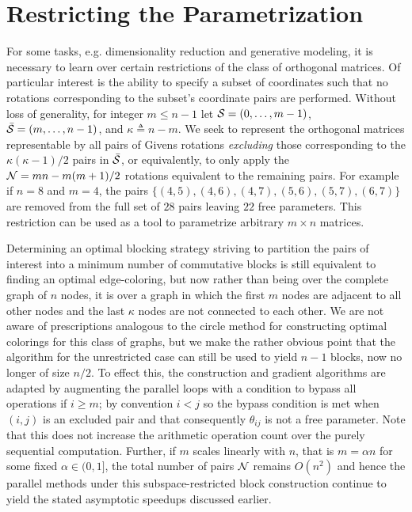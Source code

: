 \documentclass[superscriptaddress,floatfix]{article}
\begin{document}
\section{Restricting the Parametrization}
\label{sec:RestrictingParametrization}

For some tasks, e.g. dimensionality reduction and generative modeling,
it is necessary to learn over certain restrictions of the class of
orthogonal matrices. Of particular interest is the ability to specify
a subset of coordinates such that no rotations corresponding to the
subset's coordinate pairs are performed. Without loss of generality,
for integer $m \leq n-1$ let $\mathcal{S} = (0, \ldots, m-1 )$,
$\bar{\mathcal{S}} = (m,\ldots,n-1)$, and $\kappa \triangleq n-m$. We seek
to represent the orthogonal matrices representable by all pairs of
Givens rotations \emph{excluding} those corresponding to the
$\kappa(\kappa-1)/2$ pairs in $\bar{\mathcal{S}}$, or equivalently, to only
apply the $\mathcal{N} = mn - m(m+1)/2$ rotations equivalent to the
remaining pairs. For example if $n=8$ and $m=4$, the pairs
$\{(4,5), (4,6), (4,7), (5,6), (5,7), (6,7) \}$ are removed from the
full set of $28$ pairs leaving $22$ free parameters. This restriction
can be used as a tool to parametrize arbitrary $m \times n$ matrices.

Determining an optimal blocking strategy striving to partition the
pairs of interest into a minimum number of commutative blocks is still
equivalent to finding an optimal edge-coloring, but now rather than
being over the complete graph of $n$ nodes, it is over a graph in
which the first $m$ nodes are adjacent to all other nodes and the last
$\kappa$ nodes are not connected to each other. We are not aware of
prescriptions analogous to the circle method for constructing optimal
colorings for this class of graphs, but we make the rather obvious
point that the algorithm for the unrestricted case can still be used
to yield $n-1$ blocks, now no longer of size $n/2$. To effect this,
the construction and gradient algorithms are adapted by augmenting the
parallel loops with a condition to bypass all operations if
$i \geq m$; by convention $i<j$ so the bypass condition is met when
$(i,j)$ is an excluded pair and that consequently $\theta_{ij}$ is not
a free parameter. Note that this does not increase the arithmetic
operation count over the purely sequential computation. Further, if
$m$ scales linearly with $n$, that is $m = \alpha n $ for some fixed
$\alpha \in (0,1]$, the total number of pairs $\mathcal{N}$ remains $O(n^2)$
and hence the parallel methods under this subspace-restricted block
construction continue to yield the stated asymptotic speedups
discussed earlier.
\end{document}
